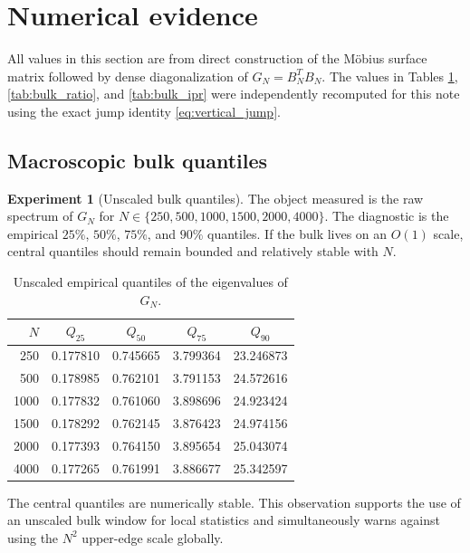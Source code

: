 \documentclass[11pt]{amsart}
\numberwithin{equation}{section}
\theoremstyle{plain}
\theoremstyle{definition}
\newtheorem{experiment}[theorem]{Experiment}
\theoremstyle{remark}
\begin{document}
\section{Numerical evidence}
\label{sec:numerical_evidence}

All values in this section are from direct construction of the M\"obius surface matrix followed by dense diagonalization of $G_N=B_N^TB_N$.  The values in Tables \ref{tab:bulk_quantiles}, \ref{tab:bulk_ratio}, and \ref{tab:bulk_ipr} were independently recomputed for this note using the exact jump identity \eqref{eq:vertical_jump}.

\subsection{Macroscopic bulk quantiles}
\label{subsec:bulk_quantiles}

\begin{experiment}[Unscaled bulk quantiles]
\label{exp:bulk_quantiles}
The object measured is the raw spectrum of $G_N$ for $N\in\{250,500,1000,1500,2000,4000\}$.  The diagnostic is the empirical $25\%$, $50\%$, $75\%$, and $90\%$ quantiles.  If the bulk lives on an $O(1)$ scale, central quantiles should remain bounded and relatively stable with $N$.

\begin{table}[htbp]
\centering
\caption{Unscaled empirical quantiles of the eigenvalues of $G_N$.}
\label{tab:bulk_quantiles}
\begin{tabular}{rcccc}
\toprule
$N$ & $Q_{25}$ & $Q_{50}$ & $Q_{75}$ & $Q_{90}$\\
\midrule
250  & 0.177810 & 0.745665 & 3.799364 & 23.246873\\
500  & 0.178985 & 0.762101 & 3.791153 & 24.572616\\
1000 & 0.177832 & 0.761060 & 3.898696 & 24.923424\\
1500 & 0.178292 & 0.762145 & 3.876423 & 24.974156\\
2000 & 0.177393 & 0.764150 & 3.895654 & 25.043074\\
4000 & 0.177265 & 0.761991 & 3.886677 & 25.342597\\
\bottomrule
\end{tabular}
\end{table}

The central quantiles are numerically stable.  This observation supports the use of an unscaled bulk window for local statistics and simultaneously warns against using the $N^2$ upper-edge scale globally.
\end{experiment}
\end{document}
